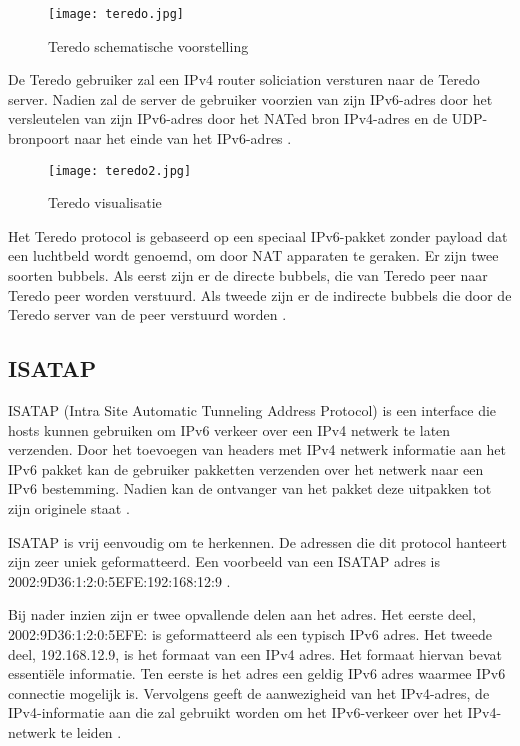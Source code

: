 \begin{figure}
\texttt{[image: teredo.jpg]}
\centering
\caption{Teredo schematische voorstelling \autocite{Vinciguerra2013}}
\centering
\end{figure}

De Teredo gebruiker zal een IPv4 router soliciation versturen naar de Teredo server. Nadien zal de server de gebruiker voorzien van zijn IPv6-adres door het versleutelen van zijn IPv6-adres door het NATed bron IPv4-adres en de UDP-bronpoort naar het einde van het IPv6-adres \autocite{Vinciguerra2013}.

\begin{figure}
\texttt{[image: teredo2.jpg]}
\centering
\caption{Teredo visualisatie \autocite{Vinciguerra2013}}
\centering
\end{figure}

Het Teredo protocol is gebaseerd op een speciaal IPv6-pakket zonder payload dat een luchtbeld wordt genoemd, om door NAT apparaten te geraken. Er zijn twee soorten bubbels. Als eerst zijn er de directe bubbels, die van Teredo peer naar Teredo peer worden verstuurd. Als tweede zijn er de indirecte bubbels die door de Teredo server van de peer verstuurd worden \autocite{teredo}.

\subsection{ISATAP}

ISATAP (Intra Site Automatic Tunneling Address Protocol) is een interface die hosts kunnen gebruiken om IPv6 verkeer over een IPv4 netwerk te laten verzenden. Door het toevoegen van headers met IPv4 netwerk informatie aan het IPv6 pakket kan de gebruiker pakketten verzenden over het netwerk naar een IPv6 bestemming. Nadien kan de ontvanger van het pakket deze uitpakken tot zijn originele staat \autocite{RIPE2016}.

ISATAP is vrij eenvoudig om te herkennen. De adressen die dit protocol hanteert zijn zeer uniek geformatteerd. Een voorbeeld van een ISATAP adres is 2002:9D36:1:2:0:5EFE:192:168:12:9 \autocite{RIPE2016}.

Bij nader inzien zijn er twee opvallende delen aan het adres. Het eerste deel, 2002:9D36:1:2:0:5EFE: is geformatteerd als een typisch IPv6 adres. Het tweede deel, 192.168.12.9, is het formaat van een IPv4 adres. Het formaat hiervan bevat essentiële informatie. Ten eerste is het adres een geldig IPv6 adres waarmee IPv6 connectie mogelijk is. Vervolgens geeft de aanwezigheid van het IPv4-adres, de IPv4-informatie aan die zal gebruikt worden om het IPv6-verkeer over het IPv4-netwerk te leiden \autocite{RIPE2016}.

